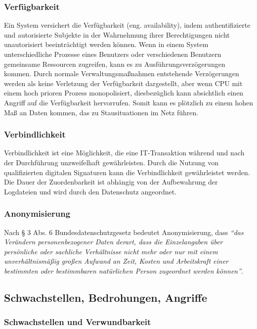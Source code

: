 \subsubsection{Verfügbarkeit}

Ein System versichert die Verfügbarkeit (eng. availability), indem authentifizierte und autorisierte Subjekte in der Wahrnehmung ihrer Berechtigungen nicht unautorisiert beeinträchtigt werden können. Wenn in einem System unterschiedliche Prozesse eines Benutzers oder verschiedenen Benutzern gemeinsame Ressourcen zugreifen, kann es zu Ausführungsverzögerungen kommen. Durch normale Verwaltungsmaßnahmen entstehende Verzögerungen werden als keine Verletzung der Verfügbarkeit dargestellt, aber wenn CPU mit einem hoch prioren Prozess monopolisiert, diesbezüglich kann absichtlich einen Angriff auf die Verfügbarkeit hervorrufen. Somit kann es plötzlich zu einem hohen Maß an Daten kommen, das zu Stausituationen im Netz führen\cite[33]{eckert2013sicherheit}.

\subsubsection{Verbindlichkeit}

Verbindlichkeit ist eine Möglichkeit, die eine IT-Transaktion während und nach der Durchführung unzweifelhaft gewährleisten. Durch die Nutzung von qualifizierten digitalen Signaturen kann die Verbindlichkeit gewährleistet werden. Die Dauer der Zuordenbarkeit ist abhängig von der Aufbewahrung der Logdateien und wird durch den Datenschutz angeordnet\cite{secupedia11}.

\subsubsection{Anonymisierung}

Nach § 3 Abs. 6 Bundesdatenschutzgesetz bedeutet Anonymisierung, dass \emph{"`das Verändern personenbezogener Daten derart, dass die Einzelangaben über persönliche oder sachliche Verhältnisse nicht mehr oder nur mit einem unverhältnismäßig großen Aufwand an Zeit, Kosten und Arbeitskraft einer bestimmten oder bestimmbaren natürlichen Person zugeordnet werden können"'}\cite{dsba2018}. 

\subsection{Schwachstellen, Bedrohungen, Angriffe}

\subsubsection{Schwachstellen und Verwundbarkeit}

